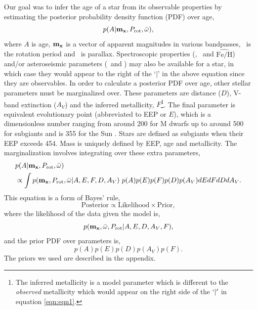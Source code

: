 Our goal was to infer the age of a star from its observable properties by
estimating the posterior probability density function (PDF) over age,
\begin{equation} \label{eqn:eqn1}
    p(A|{\bf m_x}, P_{\mathrm{rot}}, \bar{\omega}),
\end{equation}
where $A$ is age, ${\bf m_x}$ is a vector of
apparent magnitudes in various bandpasses,
\prot\ is the rotation period and \pmega\ is parallax.
Spectroscopic properties (\teff, \logg\ and $\hat{\mathrm{Fe/H}}$) and/or
asteroseismic parameters (\dnu\ and \numax) may also be available for a star,
in which case they would appear to the right of the `$|$' in the above
equation since they are observables.
In order to calculate a posterior PDF over age, other stellar parameters must
be marginalized over.
These parameters are distance ($D$), V-band extinction ($A_V$) and the
inferred metallicity, $F$\footnote{The inferred metallicity is a
model parameter which is different to the {\it observed} metallicity which
would appear on the right side of the $`|'$ in equation \ref{eqn:eqn1}.}.
The final parameter is equivalent evolutionary point (abbreviated to EEP or
$E$), which is a dimensionless number ranging from around 200 for M dwarfs up
to around 500 for subgiants and is 355 for the Sun \citep[see][]{dotter2016,
choi2016}.
Stars are defined as subgiants when their EEP exceeds 454.
Mass is uniquely defined by EEP, age and metallicity.
The marginalization involves integrating over these extra parameters,
\begin{eqnarray} \label{eqn:bayes}
    & p(A|{\bf m_x},
    P_{\mathrm{rot}}, \bar{\omega})
\\ \nonumber
    & \propto \int p({\bf m_x},
    P_\mathrm{rot}, \bar{\omega}|
    A, E, F, D, A_V)~p(A)p(E)p(F)p(D)p(A_V)dEdFdDdA_V.
\end{eqnarray}
This equation is a form of Bayes' rule,
\begin{equation} \label{eqn:eqn2}
\mathrm{Posterior} \propto \mathrm{Likelihood} \times \mathrm{Prior},
\end{equation}
where the likelihood of the data given the model is,
\begin{equation} \label{eqn:full_likelihood}
    p({\bf m_x}, \bar{\omega}, P_{\mathrm{rot}}|A, E, D, A_V, F),
\end{equation}
and the prior PDF over parameters is,
\begin{equation} \label{eqn:prior}
    p(A)p(E)p(D)p(A_V)p(F).
\end{equation}
The priors we used are described in the appendix.

